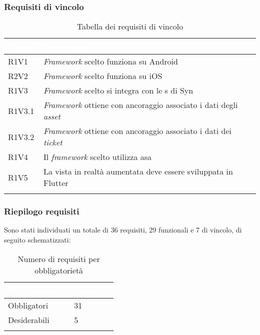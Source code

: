 \subsubsection{Requisiti di vincolo}
{
    \setlength{\freewidth}{\dimexpr\textwidth-10\tabcolsep}
    \renewcommand{\arraystretch}{1.5}
    \centering
    \setlength{\aboverulesep}{0pt}
    \setlength{\belowrulesep}{0pt}
    \begin{longtable}{C{.15\freewidth} C{1\freewidth}} 
       \toprule
    \textcolor{white}{\textbf{Codice}}&
    \textcolor{white}{\textbf{Descrizione}}\\
    \toprule
    \endhead

    R1V1 & \textit{Framework} scelto funziona su Android\\
    R2V2 & \textit{Framework} scelto funziona su iOS\\
    R1V3 & \textit{Framework} scelto si integra con le \api{}s di Syn\\
    R1V3.1 & \textit{Framework} ottiene con ancoraggio associato i dati degli \textit{asset}\\
    R1V3.2 & \textit{Framework} ottiene con ancoraggio associato i dati dei \textit{ticket}\\
    R1V4 & Il \textit{framework} scelto utilizza asa\\
    R1V5 & La vista in realtà aumentata deve essere sviluppata in Flutter\\
    \bottomrule
    \caption{Tabella dei requisiti di vincolo}
    \label{tab:requisiti-di-vincolo}
    \end{longtable}
}

\subsubsection{Riepilogo requisiti}
Sono stati individuati un totale di 36 requisiti, 29 funzionali e 7 di vincolo, di seguito schematizzati:
{
    \setlength{\freewidth}{\dimexpr\textwidth-10\tabcolsep}
    \renewcommand{\arraystretch}{1.5}
    \centering
    \setlength{\aboverulesep}{0pt}
    \setlength{\belowrulesep}{0pt}
    \begin{longtable}{C{.25\freewidth} C{.2\freewidth}} 
       \toprule
    \textcolor{white}{\textbf{Obbligatorietà}}&
    \textcolor{white}{\textbf{Quantità}}\\
    \toprule
    \endhead

    Obbligatori & 31\\
    Desiderabili & 5\\
    \bottomrule
    \caption{Numero di requisiti per obbligatorietà}
    \label{tab:requisiti-obbligatorieta}
    \end{longtable}
}

